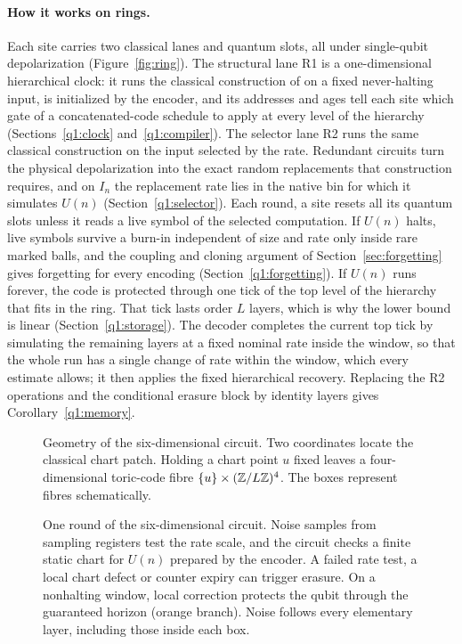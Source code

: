 \paragraph{How it works on rings.}
Each site carries two classical lanes and quantum slots, all under single-qubit depolarization (Figure~\ref{fig:ring}). The structural lane R1 is a one-dimensional hierarchical clock: it runs the classical construction of \cite{DMNoise1D2026} on a fixed never-halting input, is initialized by the encoder, and its addresses and ages tell each site which gate of a concatenated-code schedule to apply at every level of the hierarchy (Sections~\ref{q1:clock} and~\ref{q1:compiler}). The selector lane R2 runs the same classical construction on the input selected by the rate. Redundant circuits turn the physical depolarization into the exact random replacements that construction requires, and on \(I_n\) the replacement rate lies in the native bin for which it simulates \(U(n)\) (Section~\ref{q1:selector}). Each round, a site resets all its quantum slots unless it reads a live symbol of the selected computation. If \(U(n)\) halts, live symbols survive a burn-in independent of size and rate only inside rare marked balls, and the coupling and cloning argument of Section~\ref{sec:forgetting} gives forgetting for every encoding (Section~\ref{q1:forgetting}). If \(U(n)\) runs forever, the code is protected through one tick of the top level of the hierarchy that fits in the ring. That tick lasts order \(L\) layers, which is why the lower bound is linear (Section~\ref{q1:storage}). The decoder completes the current top tick by simulating the remaining layers at a fixed nominal rate inside the window, so that the whole run has a single change of rate within the window, which every estimate allows; it then applies the fixed hierarchical recovery. Replacing the R2 operations and the conditional erasure block by identity layers gives Corollary~\ref{q1:memory}.

\begin{figure}[!tb]
\centering
\caption{Geometry of the six-dimensional circuit. Two coordinates locate the classical chart patch. Holding a chart point \(u\) fixed leaves a four-dimensional toric-code fibre \(\{u\}\times(\mathbb Z/L\mathbb Z)^4\). The boxes represent fibres schematically.}\label{fig:chart-fibres}
\end{figure}

\begin{figure}[!tb]
\centering
\caption{One round of the six-dimensional circuit. Noise samples from sampling registers test the rate scale, and the circuit checks a finite static chart for \(U(n)\) prepared by the encoder. A failed rate test, a local chart defect or counter expiry can trigger erasure. On a nonhalting window, local correction protects the qubit through the guaranteed horizon (orange branch). Noise follows every elementary layer, including those inside each box.}\label{fig:round}
\end{figure}

